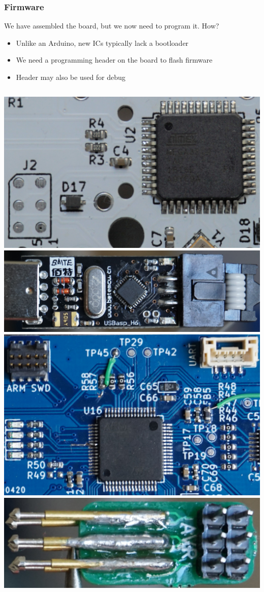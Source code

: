 \documentclass[t]{beamer}
\begin{document}
\begin{frame}
\frametitle{Firmware}
We have assembled the board, but we now need to program it. How?
\begin{itemize}
	\item Unlike an Arduino, new ICs typically lack a bootloader
	\item We need a programming header on the board to flash firmware
	\item Header may also be used for debug
\end{itemize}
\begin{columns}
	\centering
	\includegraphics[width=\linewidth]{kbprog.jpg}
	\includegraphics[width=\linewidth]{usbasp.jpg}
	\centering
	\includegraphics[width=0.9\linewidth]{vnaprog.jpg}
	\includegraphics[width=0.9\linewidth]{avrpogo.jpg}
\end{columns}
\end{frame}
\end{document}
